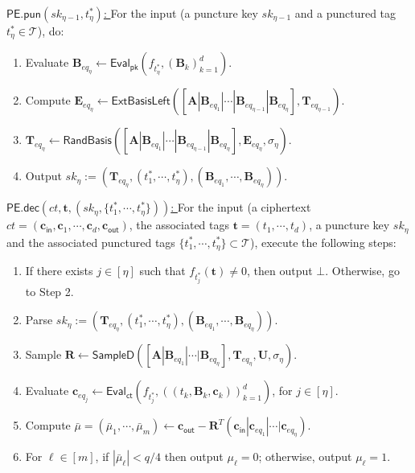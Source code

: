 \documentclass[runningheads,10pt]{llncs}
\begin{document}
\begin{description}
	\item \underline{$\textsf{PE.pun}(sk_{\eta-1},t^*_\eta)$: }
	For the input (a puncture key $sk_{\eta-1}$ and a punctured tag $t^*_\eta \in \mathcal{T}$), do:
	\begin{enumerate}
		\item Evaluate $\textbf{B}_{eq_\eta} \leftarrow \textsf{Eval}_\textsf{pk}(f_{t^*_{\eta}}, (\textbf{B}_k)_{k=1}^d)$.
		\item Compute  $\textbf{E}_{eq_{\eta}} \leftarrow \textsf{ExtBasisLeft}([\textbf{A}|\textbf{B}_{eq_{1}}|\cdots |\textbf{B}_{eq_{{\eta-1}}}|\textbf{B}_{eq_{{\eta}}}], \textbf{T}_{eq_{{\eta-1}}})$.
			\item  $\textbf{T}_{eq_{\eta}} \leftarrow \textsf{RandBasis}([\textbf{A}|\textbf{B}_{eq_{1}}|\cdots |\textbf{B}_{eq_{{\eta-1}}}|\textbf{B}_{eq_{{\eta}}}], \textbf{E}_{eq_{\eta}}, \sigma_\eta)$.
		\item Output $sk_{\eta}:=(\textbf{T}_{eq_{\eta}},(t^*_1,\cdots, t^*_{\eta}), (\textbf{B}_{eq_{1}}, \cdots, \textbf{B}_{eq_{\eta}}))$.
	\end{enumerate}
	
	\item \underline{$\textsf{PE.dec}(ct, \textbf{t}, (sk_\eta, \{t^*_1, \cdots, t^*_{\eta}\}))$: }
	For the input (a ciphertext $ct=(\textbf{c}_{\textsf{in}}, \textbf{c}_1, \cdots, \textbf{c}_{d}, \textbf{c}_{\textsf{out}}) $, 
	the associated tags $\textbf{t}=(t_1, \cdots, t_d)$, 
	a puncture key $sk_{\eta}$ and the associated punctured tags $\{t^*_1, \cdots, t^*_{\eta}\} \subset \mathcal{T}$), execute the following steps:
	\begin{enumerate}
		\item If there exists $j\in [\eta]$ such that $f_{t^*_j}(\textbf{t}) \neq 0$, then output $\bot$. Otherwise, go to Step 2.
		\item Parse $sk_{\eta}:=(\textbf{T}_{eq_{\eta}},(t^*_1,\cdots, t^*_{\eta}), (\textbf{B}_{eq_{1}}, \cdots, \textbf{B}_{eq_{\eta}}))$.
		\item Sample $\textbf{R} \leftarrow \textsf{SampleD}([\textbf{A} |\textbf{B}_{eq_{1}}|\cdots |\textbf{B}_{eq_{{\eta}}}], \textbf{T}_{eq_{{\eta}}}, \textbf{U}, \sigma_\eta)$.
		\item Evaluate  $\textbf{c}_{eq_j}\leftarrow \textsf{Eval}_\textsf{ct}(f_{t^*_j},  ((t_k, \textbf{B}_k, \textbf{c}_{k}))_{k=1}^{d})$, for $j\in [\eta]$.
		\item Compute $\bar{\mu}=(\bar{\mu}_1, \cdots, \bar{\mu}_m) \leftarrow \textbf{c}_{\textsf{out}}-\textbf{R}^T(\textbf{c}_\textsf{in}|\textbf{c}_{eq_{1}}|\cdots|\textbf{c}_{eq_\eta})$.
		
		\item For $\ell \in [m]$,  if $ |\bar{\mu}_\ell | <q/4$ then output $\mu_\ell=0$;  otherwise, output $\mu_\ell=1$.
	\end{enumerate}  
\end{description}
\end{document}
